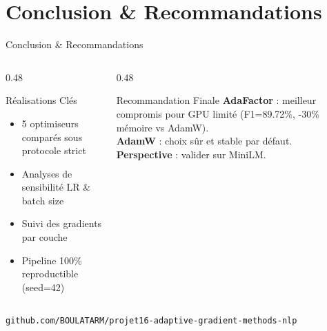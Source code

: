 \documentclass[10pt, aspectratio=169]{beamer}
\begin{document}
\section{Conclusion \& Recommandations}
\begin{frame}{Conclusion \& Recommandations}
    \vspace{0.1cm}
    \begin{columns}[t]
        \begin{column}{0.48\textwidth}
            \begin{block}{\faFlag\quad Réalisations Clés}
                \scriptsize
                \begin{itemize}
                    \setlength{\itemsep}{4pt}
                    \item[\color{StartupCyan}\faCheck] 5 optimiseurs comparés sous protocole strict
                    \item[\color{StartupCyan}\faCheck] Analyses de sensibilité LR \& batch size
                    \item[\color{StartupCyan}\faCheck] Suivi des gradients par couche
                    \item[\color{StartupCyan}\faCheck] Pipeline 100\% reproductible (seed=42)
                \end{itemize}
            \end{block}
        \end{column}

        \begin{column}{0.48\textwidth}
            \begin{alertblock}{\faTrophy\quad Recommandation Finale}
                \scriptsize
                \textbf{AdaFactor} : meilleur compromis pour GPU limité (F1=89.72\%, -30\% mémoire vs AdamW).
                \\[6pt]
                \textbf{AdamW} : choix sûr et stable par défaut.
                \\[6pt]
                \textbf{Perspective} : valider sur MiniLM.
            \end{alertblock}
        \end{column}
    \end{columns}
    \vspace{0.4cm}
    \begin{center}
        {\footnotesize \color{StartupBlue} \faGithub \quad \texttt{github.com/BOULATARM/projet16-adaptive-gradient-methods-nlp}}
    \end{center}
    \vspace{0.2cm}
\end{frame}
\end{document}
